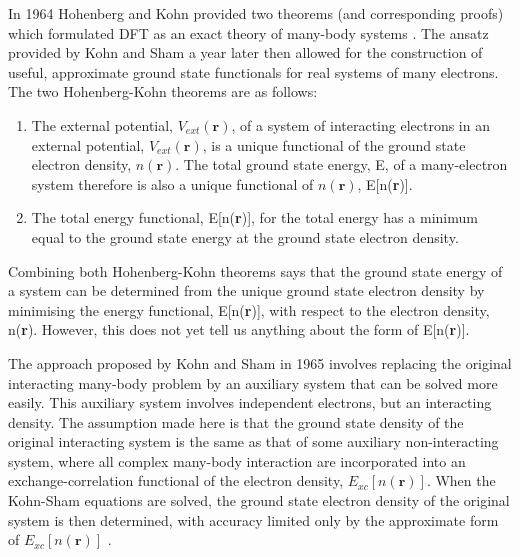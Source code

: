 \documentclass[11pt, twoside]{report}
\begin{document}
In 1964 Hohenberg and Kohn provided two theorems (and corresponding proofs) which formulated DFT as an exact theory of many-body systems \cite{hohenberg_kohn1964}. The ansatz provided by Kohn and Sham a year later \cite{Kohn_Sham1965} then allowed for the construction of useful, approximate ground state functionals for real systems of many electrons. The two Hohenberg-Kohn theorems are as follows:
\begin{enumerate}
\item The external potential, $V_{ext}(\mathbf{r})$, of a system of interacting electrons in an external potential, $V_{ext}(\mathbf{r})$, is a unique functional of the ground state electron density, $n(\mathbf{r})$. The total ground state energy, E, of a many-electron system therefore is also a unique functional of $n(\mathbf{r})$, E[n(\textbf{r})].
\item The total energy functional, E[n(\textbf{r})], for the total energy has a minimum equal to the ground state energy at the ground state electron density. 
\end{enumerate}
Combining both Hohenberg-Kohn theorems says that the ground state energy of a system can be determined from the unique ground state electron density by minimising the energy functional, E[n(\textbf{r})], with respect to the electron density, n(\textbf{r}). However, this does not yet tell us anything about the form of E[n(\textbf{r})]. 

The approach proposed by Kohn and Sham in 1965 involves replacing the original interacting many-body problem by an auxiliary system that can be solved more easily. This auxiliary system involves independent electrons, but an interacting density. The assumption made here is that the ground state density of the original interacting system is the same as that of some auxiliary non-interacting system, where all complex many-body interaction are incorporated into an exchange-correlation functional of the electron density, $E_{xc}[n(\mathbf{r})]$. When the Kohn-Sham equations are solved, the ground state electron density of the original system is then determined, with accuracy limited only by the approximate form of $E_{xc}[n(\mathbf{r})]$ \cite{RichardMartin_Ch7}.
\end{document}

